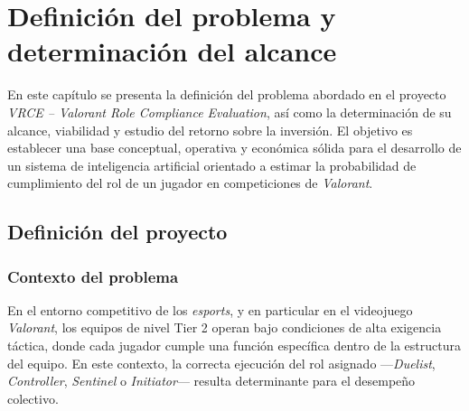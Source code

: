 \documentclass{ULBreport} %
\begin{document}

\tableofcontents
\listoftables
\listoffigures


\chapter{Definición del problema y determinación del alcance}

En este capítulo se presenta la definición del problema abordado en el proyecto \textit{VRCE -- Valorant Role Compliance Evaluation}, así como la determinación de su alcance, viabilidad y estudio del retorno sobre la inversión. El objetivo es establecer una base conceptual, operativa y económica sólida para el desarrollo de un sistema de inteligencia artificial orientado a estimar la probabilidad de cumplimiento del rol de un jugador en competiciones de \textit{Valorant}.

\section{Definición del proyecto}

\subsection{Contexto del problema}

En el entorno competitivo de los \textit{esports}, y en particular en el videojuego \textit{Valorant}, los equipos de nivel Tier 2 operan bajo condiciones de alta exigencia táctica, donde cada jugador cumple una función específica dentro de la estructura del equipo. En este contexto, la correcta ejecución del rol asignado ---\textit{Duelist}, \textit{Controller}, \textit{Sentinel} o \textit{Initiator}--- resulta determinante para el desempeño colectivo.
\end{document}
